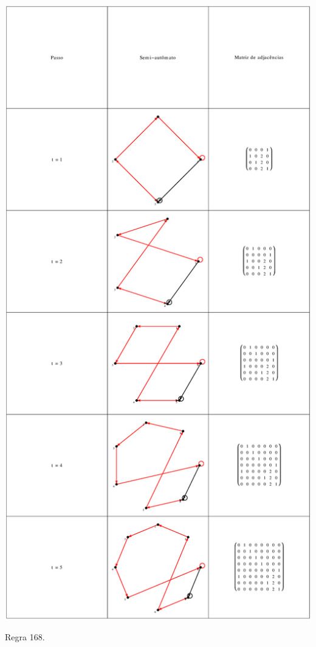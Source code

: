 \documentclass[12pt,a4paper]{article}
\begin{document}
\begin{table}[H]
\begin{center}
\includegraphics[scale=0.32]{img/mat/matr168.eps}
\caption{Regra 168.}
\label{tab:mr168}
\end{center}
\end{table}
\end{document}
